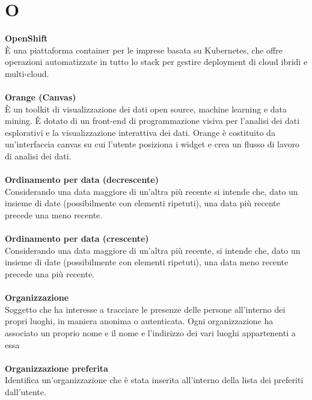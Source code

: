 \section{O}
\textbf{OpenShift}\\
È una piattaforma container per le imprese basata su Kubernetes, che offre operazioni automatizzate in tutto lo stack per gestire deployment di cloud ibridi e multi-cloud. \\ \\
\textbf{Orange (Canvas)}\\
È un toolkit di visualizzazione dei dati open source, machine learning e data mining. È dotato di un front-end di programmazione visiva per l'analisi dei dati esplorativi e la visualizzazione interattiva dei dati. Orange è costituito da un'interfaccia canvas su cui l'utente posiziona i widget e crea un flusso di lavoro di analisi dei dati. \\ \\
\textbf{Ordinamento per data (decrescente)}\\
Considerando una data maggiore di un'altra più recente si intende che, dato un insieme di date (possibilmente con elementi ripetuti), una data più recente precede una meno recente. \\ \\
\textbf{Ordinamento per data (crescente)}\\
Considerando una data maggiore di un'altra più recente, si intende che, dato un insieme di date (possibilmente con elementi ripetuti), una data meno recente precede una più recente. \\ \\
\textbf{Organizzazione}\\
Soggetto che ha interesse a tracciare le presenze delle persone all’interno dei propri luoghi, in maniera anonima o autenticata. Ogni organizzazione ha associato un proprio nome e il nome e l'indirizzo dei vari luoghi appartenenti a essa \\ \\
\textbf{Organizzazione preferita}\\
Identifica un'organizzazione che è stata inserita all'interno della lista dei preferiti dall'utente. \\ \\
\clearpage